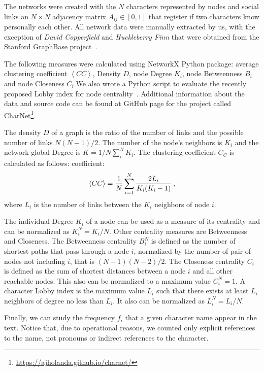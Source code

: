 \documentclass[review]{elsarticle}
\begin{document}
The networks were created with the $N$ characters 
represented by nodes and social links an $N\times N$
adjacency matrix $A_{ij} \in [0,1]$ that register if two
characters know personally each other. All network
data were manually extracted by us, with the exception of 
\emph{David Copperfield} and \emph{Huckleberry Finn} 
that were obtained from the Stanford GraphBase project~\citep{sgb}.

The following measures were calculated using NetworkX 
Python package: average clustering coefficient 
$\left\langle CC\right\rangle$, 
Density $D$, node Degree $K_i$, node
Betweenness $B_i$ and node Closeness $C_i$.We also wrote a Python script to 
evaluate the recently proposed Lobby
index for node centrality~\cite{korn2009,
campiteli2013,lu2016}. 
Additional information about the data and source code can be found 
at GitHub page for the project called 
CharNet\footnote{\url{https://ajholanda.github.io/charnet/}}.

The density $D$  of a graph is the ratio of the number of links and the 
possible number of links $N(N-1)/2$.  The 
number of the node's neighbors is $K_i$ and the network
global Degree  is $K = 1/N \sum_i^N K_i$. 
The clustering coefficient $C_C$  is calculated as follows:
coefficient:
\begin{equation}
\left\langle CC \right\rangle = 
\frac{1}{N} \sum_{i=1}^N {2L_i \over {K_i(K_i-1)}} \:,
\end{equation}
\noindent where  $L_i$ is the number 
of links between the $K_i$ neighbors of node $i$. 

The individual Degree $K_i$ of a node can be used as a measure
of its centrality and can be normalized as 
$K_i^N = K_i/N$. Other centrality measures are Betweenness and
Closeness. The Betweenness centrality $B_i^N$ is  defined 
as the number of shortest paths that 
pass through a node $i$, normalized 
by the number of pair of nodes not including $i$, that 
is $(N-1)(N-2)/2$. The Closeness centrality $C_i$ is  defined as 
the sum of shortest distances 
between a node $i$ and all other reachable nodes.
This also can be normalized to a maximum value $C^N_i=1$.
A character Lobby index is the maximum value $L_i$ such that there 
exists at least $L_i$ neighbors of degree no less than  $L_i$.
It also can be normalized as $L_i^N = L_i/N$.

Finally, we can study the frequency $f_i$ that a given 
character name appear in the text. Notice that, due to
operational reasons, we counted only
explicit references to the name, not pronouns 
or indirect references to the character.
\end{document}
